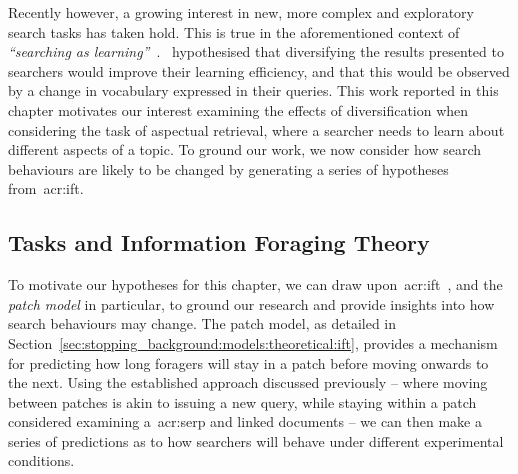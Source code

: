 Recently however, a growing interest in new, more complex and exploratory search tasks has taken hold. This is true in the aforementioned context of \emph{``searching as learning''}~\citep{collins2017sal}.~\cite{syed2017sal} hypothesised that diversifying the results presented to searchers would improve their learning efficiency, and that this would be observed by a change in vocabulary expressed in their queries. This work reported in this chapter motivates our interest examining the effects of diversification when considering the task of aspectual retrieval, where a searcher needs to learn about different aspects of a topic. To ground our work, we now consider how search behaviours are likely to be changed by generating a series of hypotheses from~\gls{acr:ift}.

\subsection{Tasks and Information Foraging Theory}\label{sec:diversity:background:tasks}
To motivate our hypotheses for this chapter, we can draw upon~\gls{acr:ift}~\citep{pirolli1999ift}, and the \emph{patch model} in particular, to ground our research and provide insights into how search behaviours may change. The patch model, as detailed in Section~\ref{sec:stopping_background:models:theoretical:ift}, provides a mechanism for predicting how long foragers will stay in a patch before moving onwards to the next. Using the established approach discussed previously -- where moving between patches is akin to issuing a new query, while staying within a patch considered examining a~\gls{acr:serp} and linked documents -- we can then make a series of predictions as to how searchers will behave under different experimental conditions.

